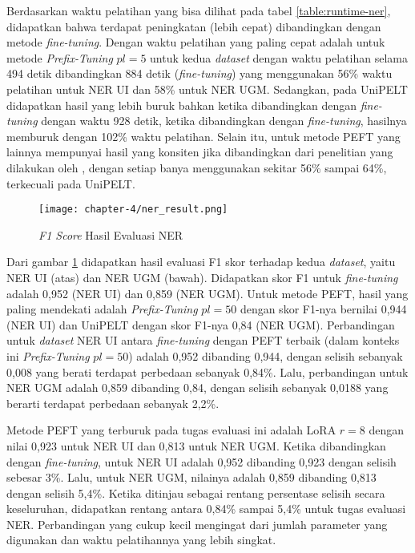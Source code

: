 Berdasarkan waktu pelatihan yang bisa dilihat pada tabel \ref{table:runtime-ner}, didapatkan bahwa terdapat peningkatan (lebih cepat) dibandingkan dengan metode \textit{fine-tuning}. Dengan waktu pelatihan yang paling cepat adalah untuk metode \textit{Prefix-Tuning} $pl=5$ untuk kedua \textit{dataset} dengan waktu pelatihan selama 494 detik dibandingkan 884 detik (\textit{fine-tuning}) yang menggunakan 56\% waktu pelatihan untuk NER UI dan 58\% untuk NER UGM. Sedangkan, pada UniPELT didapatkan hasil yang lebih buruk bahkan ketika dibandingkan dengan \textit{fine-tuning} dengan waktu 928 detik, ketika dibandingkan dengan \textit{fine-tuning}, hasilnya memburuk dengan 102\% waktu pelatihan. Selain itu, untuk metode PEFT yang lainnya mempunyai hasil yang konsiten jika dibandingkan dari penelitian yang dilakukan oleh \citeauthor{unipelt}, dengan setiap banya menggunakan sekitar 56\% sampai 64\%, terkecuali pada UniPELT.

\begin{figure}[h]
    \centering
    \centerline{\texttt{[image: chapter-4/ner\_result.png]}}
    \caption{\textit{F1 Score} Hasil Evaluasi NER}
    \label{fig:ner-result}
\end{figure}

Dari gambar \ref{fig:ner-result} didapatkan hasil evaluasi F1 skor terhadap kedua \textit{dataset}, yaitu NER UI (atas) dan NER UGM (bawah). Didapatkan skor F1 untuk \textit{fine-tuning} adalah 0,952 (NER UI) dan 0,859 (NER UGM). Untuk metode PEFT, hasil yang paling mendekati adalah \textit{Prefix-Tuning} $pl=50$ dengan skor F1-nya bernilai 0,944 (NER UI) dan UniPELT dengan skor F1-nya 0,84 (NER UGM). Perbandingan untuk \textit{dataset} NER UI antara \textit{fine-tuning} dengan PEFT terbaik (dalam konteks ini \textit{Prefix-Tuning} $pl=50$) adalah 0,952 dibanding 0,944, dengan selisih sebanyak 0,008 yang berati terdapat perbedaan sebanyak 0,84\%. Lalu, perbandingan untuk NER UGM adalah 0,859 dibanding 0,84, dengan selisih sebanyak 0,0188 yang berarti terdapat perbedaan sebanyak 2,2\%. 

Metode PEFT yang terburuk pada tugas evaluasi ini adalah LoRA $r=8$ dengan nilai 0,923 untuk NER UI dan 0,813 untuk NER UGM. Ketika dibandingkan dengan \textit{fine-tuning}, untuk NER UI adalah 0,952 dibanding 0,923 dengan selisih sebesar 3\%. Lalu, untuk NER UGM, nilainya adalah 0,859 dibanding 0,813 dengan selisih 5,4\%. Ketika ditinjau sebagai rentang persentase selisih secara keseluruhan, didapatkan rentang antara 0,84\% sampai 5,4\% untuk tugas evaluasi NER. Perbandingan yang cukup kecil mengingat dari jumlah parameter yang digunakan dan waktu pelatihannya yang lebih singkat.

